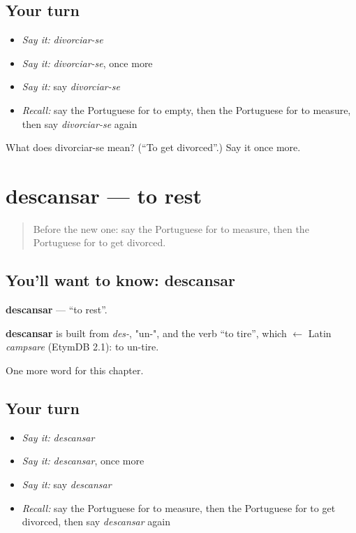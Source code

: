 \subsection*{Your turn}
\begin{itemize}
\raggedright
  \item \emph{Say it:} \emph{divorciar-se}
  \item \emph{Say it:} \emph{divorciar-se}, once more
  \item \emph{Say it:} say \emph{divorciar-se}
  \item \emph{Recall:} say the Portuguese for to empty, then the Portuguese for to measure, then say \emph{divorciar-se} again
\end{itemize}

\begin{tcolorbox}[breakable,colback=teal!4,colframe=teal!35!black,title={Before you move on}]
What does divorciar-se mean? (\textquotedblleft{}To get divorced\textquotedblright{}.) Say it once more.
\end{tcolorbox}
\section[descansar]{descansar — to rest}

\label{lesson:PT-C203-descansar}



\begin{quote}
Before the new one: say the Portuguese for to measure, then the Portuguese for to get divorced.
\end{quote}

\subsection*{You'll want to know: descansar}
\textbf{descansar} — \textquotedblleft{}to rest\textquotedblright{}.

\begin{cousinweb}
\textbf{descansar} is built from \emph{des-}, "un-", and the verb \textquotedblleft{}to tire\textquotedblright{}, which $\leftarrow$ Latin \emph{campsare} (EtymDB 2.1): to un-tire.
\end{cousinweb}

\begin{grammarlens}[title={What you've built}]
One more word for this chapter.
\end{grammarlens}

\subsection*{Your turn}
\begin{itemize}
\raggedright
  \item \emph{Say it:} \emph{descansar}
  \item \emph{Say it:} \emph{descansar}, once more
  \item \emph{Say it:} say \emph{descansar}
  \item \emph{Recall:} say the Portuguese for to measure, then the Portuguese for to get divorced, then say \emph{descansar} again
\end{itemize}

